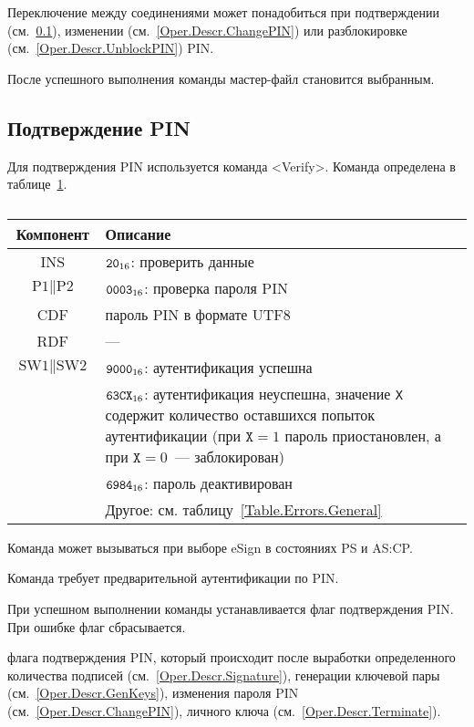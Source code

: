 Переключение между соединениями может понадобиться
при подтверждении (см.~\ref{Oper.Descr.VerifyPIN}), 
изменении (см.~\ref{Oper.Descr.ChangePIN})
или разблокировке (см.~\ref{Oper.Descr.UnblockPIN}) PIN.

После успешного выполнения команды мастер-файл становится выбранным. 

\subsection{Подтверждение PIN}
\label{Oper.Descr.VerifyPIN}

Для подтверждения PIN используется команда <Verify>. 
Команда определена в таблице~\ref{Table.Oper.VerifyPINCmd}.

\begin{table}[hbt]
\caption{}\label{Table.Oper.VerifyPINCmd}
\begin{tabular}{|c|p{14cm}|}
\hline
Компонент & Описание \\
\hline
\hline
INS & $\texttt{20}_{16}$: проверить данные\\
\hline
$\text{P1} \parallel \text{P2}$ & $\texttt{0003}_{16}$: 
проверка пароля PIN\\
\hline
CDF & пароль PIN в формате UTF8 \\
\hline 
RDF &  --- \\
\hline
$\text{SW1} \parallel \text{SW2}$ & $\texttt{9000}_{16}$: аутентификация успешна\\
\cline{2-2}
 & $\texttt{63CX}_{16}$: аутентификация неуспешна, значение \texttt{X} содержит количество 
оставшихся попыток аутентификации (при $\texttt{X} = 1$ пароль 
приостановлен, а при $\texttt{X} = 0$~--- заблокирован)\\
\cline{2-2}
& $\texttt{6984}_{16}$: пароль деактивирован \\
\cline{2-2}
 & Другое: см. таблицу~\ref{Table.Errors.General} \\
\hline
\end{tabular}
\end{table}

Команда может вызываться при выборе eSign в состояниях PS и AS:CP.

Команда требует предварительной аутентификации по PIN.

При успешном выполнении команды устанавливается флаг подтверждения PIN. При 
ошибке флаг сбрасывается. 

флага подтверждения PIN, который происходит 
после выработки определенного количества подписей (см.~\ref{Oper.Descr.Signature}),
генерации ключевой пары (см.~\ref{Oper.Descr.GenKeys}),
изменения пароля PIN (см.~\ref{Oper.Descr.ChangePIN}),
 личного ключа (см.~\ref{Oper.Descr.Terminate}).

